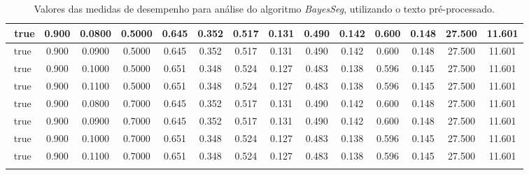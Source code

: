 \begin{longtable}[c]{|c|c|c|c|c|c|c|c|c|c|c|c|c|c|}
$$  true & 0.900 & 0.0800 & 0.5000 & 0.645 & 0.352 & 0.517 & 0.131 & 0.490 & 0.142 & 0.600 & 0.148 & 27.500 & 11.601  \\ \hline 
  true & 0.900 & 0.0900 & 0.5000 & 0.645 & 0.352 & 0.517 & 0.131 & 0.490 & 0.142 & 0.600 & 0.148 & 27.500 & 11.601  \\ \hline 
  true & 0.900 & 0.1000 & 0.5000 & 0.651 & 0.348 & 0.524 & 0.127 & 0.483 & 0.138 & 0.596 & 0.145 & 27.500 & 11.601  \\ \hline 
  true & 0.900 & 0.1100 & 0.5000 & 0.651 & 0.348 & 0.524 & 0.127 & 0.483 & 0.138 & 0.596 & 0.145 & 27.500 & 11.601  \\ \hline 
  true & 0.900 & 0.0800 & 0.7000 & 0.645 & 0.352 & 0.517 & 0.131 & 0.490 & 0.142 & 0.600 & 0.148 & 27.500 & 11.601  \\ \hline 
  true & 0.900 & 0.0900 & 0.7000 & 0.645 & 0.352 & 0.517 & 0.131 & 0.490 & 0.142 & 0.600 & 0.148 & 27.500 & 11.601  \\ \hline 
  true & 0.900 & 0.1000 & 0.7000 & 0.651 & 0.348 & 0.524 & 0.127 & 0.483 & 0.138 & 0.596 & 0.145 & 27.500 & 11.601  \\ \hline 
  true & 0.900 & 0.1100 & 0.7000 & 0.651 & 0.348 & 0.524 & 0.127 & 0.483 & 0.138 & 0.596 & 0.145 & 27.500 & 11.601  \\ \hline 
 \caption{Valores das medidas de desempenho para análise do algoritmo \textit{BayesSeg}, utilizando o texto pré-processado.}
 \end{longtable} 



